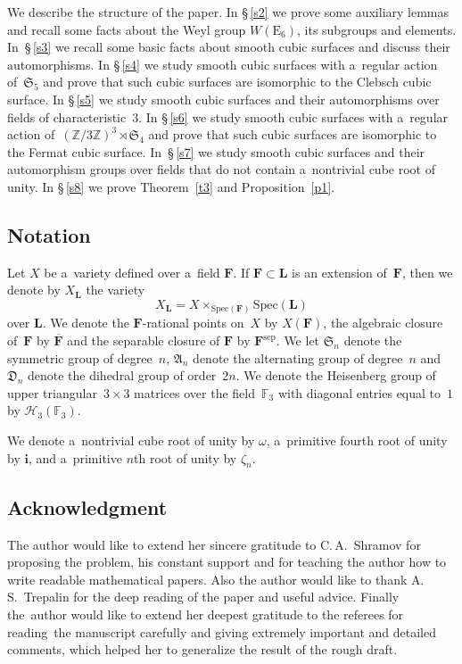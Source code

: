 \documentclass{amsart}
\numberwithin{equation}{section}
\theoremstyle{plain}
\theoremstyle{definition}
\theoremstyle{remark}
\begin{document}
We describe the structure of the paper. In \S\,\ref{s2} we prove some
auxiliary lemmas and recall some facts about the Weyl group
$W(\mathrm{E}_6)$, its subgroups and elements. In~\S\,\ref{s3} we recall some
basic facts about smooth cubic surfaces and discuss their automorphisms. In
\S\,\ref{s4} we study smooth cubic surfaces with a~regular action
of~$\mathfrak{S}_5$ and prove that such cubic surfaces are isomorphic to the
Clebsch cubic surface. In \S\,\ref{s5} we study smooth cubic surfaces and
their automorphisms over fields of characteristic~$3$. In \S\,\ref{s6} we
study smooth cubic surfaces with a~regular action
of~$(\mathbb{Z}/3\mathbb{Z})^3 \rtimes \mathfrak{S}_4$ and prove that such
cubic surfaces are isomorphic to the Fermat cubic surface. In~\S\,\ref{s7} we
study smooth cubic surfaces and their automorphism groups over fields that do
not contain a~nontrivial cube root of unity. In \S\,\ref{s8} we prove
Theorem~\ref{t3} and Proposition~\ref{p1}.

\subsection*{Notation}
Let $X$ be a~variety defined over a~field $\mathbf{F}$. If $\mathbf{F} \subset \mathbf{L}$ is an extension of~$\mathbf{F}$, then we denote by $X_{\mathbf{L}}$ the variety
$$
X_{\mathbf{L}}=X \times_{\mathrm{Spec}(\mathbf{F})}\mathrm{Spec}(\mathbf{L})
$$
over $\mathbf{L}$. We denote the $\mathbf{F}$-rational points
on~$X$ by $X(\mathbf{F})$, the algebraic closure of~$\mathbf{F}$ by $\overline{\mathbf{F}}$ and the separable closure
of $\mathbf{F}$ by $\mathbf{F}^{\mathrm{sep}}$. We let $\mathfrak{S}_n$ denote the symmetric group of
degree~$n$, $\mathfrak{A}_n$ denote the alternating group of degree~$n$
and $\mathfrak{D}_n$ denote the dihedral group of order~$2n$. We denote the Heisenberg group of upper
triangular~$3\times 3$ matrices over the field~$\mathbb{F}_3$ with diagonal
entries equal to~$1$ by
$\mathcal{H}_3(\mathbb{F}_3)$.

We denote a~nontrivial cube root of unity by $\omega$,
 a~primitive fourth root of unity by $\mathbf{i}$, and a~primitive $n$th root of unity by $\zeta_n$.

\subsection*{Acknowledgment}
The author would like to extend her sincere gratitude to C.\,A.~Shramov for proposing the problem, his constant support and for teaching the author how to write readable mathematical papers. Also the author would like to thank A.\,S.~Trepalin for the deep reading of the paper and useful advice. Finally the~author would like to extend her deepest gratitude to the referees for reading~the manuscript carefully and giving extremely important and detailed comments, which helped her to generalize the result of the rough draft.
\end{document}
